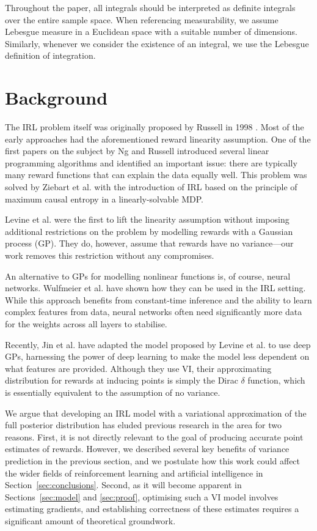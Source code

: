 \documentclass{mpaper}
\begin{document}
Throughout the paper, all integrals should be interpreted as definite integrals
over the entire sample space. When referencing measurability, we assume Lebesgue
measure in a Euclidean space with a suitable number of dimensions. Similarly,
whenever we consider the existence of an integral, we use the Lebesgue
definition of integration.

\section{Background} %

The IRL problem itself was originally proposed by Russell in 1998
\cite{DBLP:conf/colt/Russell98}. Most of the early approaches had the
aforementioned reward linearity assumption. One of the first papers on the
subject by Ng and Russell \cite{DBLP:conf/icml/NgR00} introduced several linear
programming algorithms and identified an important issue: there are typically
many reward functions that can explain the data equally well. This problem was
solved by Ziebart et al. \cite{ziebart2008maximum} with the introduction of IRL
based on the principle of maximum causal entropy in a linearly-solvable MDP.

Levine et al. \cite{DBLP:conf/nips/LevinePK11} were the first to lift the
linearity assumption without imposing additional restrictions on the problem by
modelling rewards with a Gaussian process (GP). They do, however, assume that
rewards have no variance---our work removes this restriction without any
compromises.

An alternative to GPs for modelling nonlinear functions is, of course, neural
networks. Wulfmeier et al. \cite{wulfmeier2015maximum} have shown how they can
be used in the IRL setting. While this approach benefits from constant-time
inference and the ability to learn complex features from data, neural
networks often need significantly more data for the weights across all layers to
stabilise.

Recently, Jin et al. \cite{DBLP:conf/uai/JinDAS17} have adapted the model
proposed by Levine et al. \cite{DBLP:conf/nips/LevinePK11} to use deep GPs,
harnessing the power of deep learning to make the model less dependent on what
features are provided. Although they use VI, their approximating distribution
for rewards at inducing points is simply the Dirac $\delta$ function, which is
essentially equivalent to the assumption of no variance.

We argue that developing an IRL model with a variational approximation of the
full posterior distribution has eluded previous research in the area for two
reasons. First, it is not directly relevant to the goal of producing accurate
point estimates of rewards. However, we described several key benefits of
variance prediction in the previous section, and we postulate how this work
could affect the wider fields of reinforcement learning and artificial
intelligence in Section~\ref{sec:conclusions}. Second, as it will become
apparent in Sections~\ref{sec:model} and \ref{sec:proof}, optimising such a VI
model involves estimating gradients, and establishing correctness of these
estimates requires a significant amount of theoretical groundwork.
\end{document}
